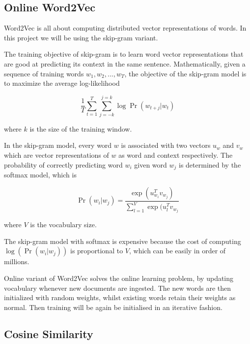 \documentclass[journal,12pt,onecolumn,draftclsnofoot,]{IEEEtran}
\begin{document}
\subsection{Online Word2Vec}

Word2Vec is all about computing distributed vector representations of words. In this project we will be using the skip-gram variant. 


The training objective of skip-gram is to learn word vector representations that are good at predicting its context in the same sentence. Mathematically, given a sequence of training words $w_1,w_2,...,w_T$, the objective of the skip-gram model is to maximize the average log-likelihood

$$ \frac{1}{T}\sum_{t=1}^T\sum_{j=-k}^{j=k} \log \Pr(w_{t+j} | w_t) $$

where $k$ is the size of the training window. 

In the skip-gram model, every word $w$ is associated with two vectors $u_w$ and $v_w$ which are vector representations of $w$ as word and context respectively. The probability of correctly predicting word $w_i$ given word $w_j$ is determined by the softmax model, which is

$$ \Pr (w_i | w_j) = \frac{\exp(u_{w_i}^T v_{w_j})}{\sum_{l=1}^V \exp(u_l^T v_{w_j}} $$

where $V$ is the vocabulary size. 

The skip-gram model with softmax is expensive because the cost of computing $\log (\Pr(w_i | w_j))$ is proportional to $V$, which can be easily in order of millions.%


Online variant of Word2Vec solves the online learning problem, by updating vocabulary whenever new documents are ingested. The new words are then initialized with random weights, whilst existing words retain their weights as normal. Then training will be again be initialised in an iterative fashion. %


\subsection{Cosine Similarity}
\end{document}
